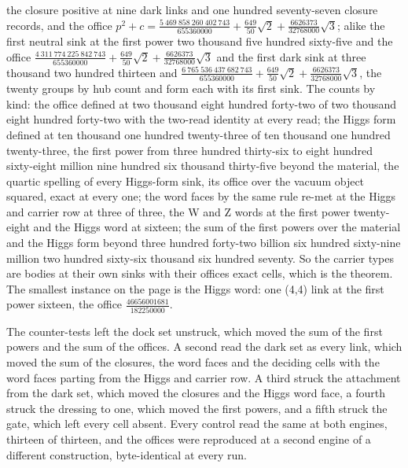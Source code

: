 \begin{chproof}
\begin{equation}
\end{equation}
the closure positive at nine dark links and one hundred seventy-seven closure records, and the office $p^{2} + c = \tfrac{5\ 469\ 858\ 260\ 402\ 743}{655360000} + \tfrac{649}{50}\sqrt{2} + \tfrac{6626373}{32768000}\sqrt{3}$; alike the first neutral sink at the first power two thousand five hundred sixty-five and the office $\tfrac{4\ 311\ 774\ 225\ 842\ 743}{655360000} + \tfrac{649}{50}\sqrt{2} + \tfrac{6626373}{32768000}\sqrt{3}$ and the first dark sink at three thousand two hundred thirteen and $\tfrac{6\ 765\ 536\ 437\ 682\ 743}{655360000} + \tfrac{649}{50}\sqrt{2} + \tfrac{6626373}{32768000}\sqrt{3}$, the twenty groups by hub count and form each with its first sink. The counts by kind: the office defined at two thousand eight hundred forty-two of two thousand eight hundred forty-two with the two-read identity at every read; the Higgs form defined at ten thousand one hundred twenty-three of ten thousand one hundred twenty-three, the first power from three hundred thirty-six to eight hundred sixty-eight million nine hundred six thousand thirty-five beyond the material, the quartic spelling of every Higgs-form sink, its office over the vacuum object squared, exact at every one; the word faces by the same rule re-met at the Higgs and carrier row at three of three, the W and Z words at the first power twenty-eight and the Higgs word at sixteen; the sum of the first powers over the material and the Higgs form beyond three hundred forty-two billion six hundred sixty-nine million two hundred sixty-six thousand six hundred seventy. So the carrier types are bodies at their own sinks with their offices exact cells, which is the theorem. The smallest instance on the page is the Higgs word: one (4,4) link at the first power sixteen, the office $\tfrac{46656001681}{182250000}$.

The counter-tests left the dock set unstruck, which moved the sum of the first powers and the sum of the offices. A second read the dark set as every link, which moved the sum of the closures, the word faces and the deciding cells with the word faces parting from the Higgs and carrier row. A third struck the attachment from the dark set, which moved the closures and the Higgs word face, a fourth struck the dressing to one, which moved the first powers, and a fifth struck the gate, which left every cell absent. Every control read the same at both engines, thirteen of thirteen, and the offices were reproduced at a second engine of a different construction, byte-identical at every run.
\end{chproof}
